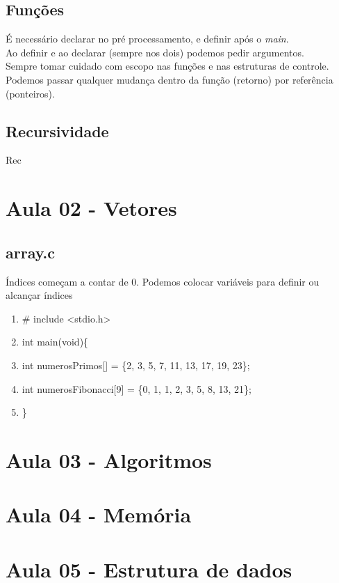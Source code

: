 \documentclass[12pt,a4paper]{article} %
\begin{document}
\subsection{Funções}
É necessário declarar no pré processamento, e definir após o \textit{main}.\\
Ao definir e ao declarar (sempre nos dois) podemos pedir argumentos.\\
Sempre tomar cuidado com escopo nas funções e nas estruturas de controle.\\
Podemos passar qualquer mudança dentro da função (retorno) por referência (ponteiros).\\
\subsection{Recursividade}
Rec

\section{Aula 02 - Vetores}
\subsection{array.c}
Índices começam a contar de 0. Podemos colocar variáveis para definir ou alcançar índices
\begin{enumerate}
\item \# include <stdio.h>
\item int main(void)\{
\item \tabto{1.1cm}int numerosPrimos[] = \{2, 3, 5, 7, 11, 13, 17, 19, 23\};
\item \tabto{1.1cm}int numerosFibonacci[9] = \{0, 1, 1, 2, 3, 5, 8, 13, 21\};
\item \}
\end{enumerate}

\section{Aula 03 - Algoritmos}

\section{Aula 04 - Memória}

\section{Aula 05 - Estrutura de dados}
\end{document}
